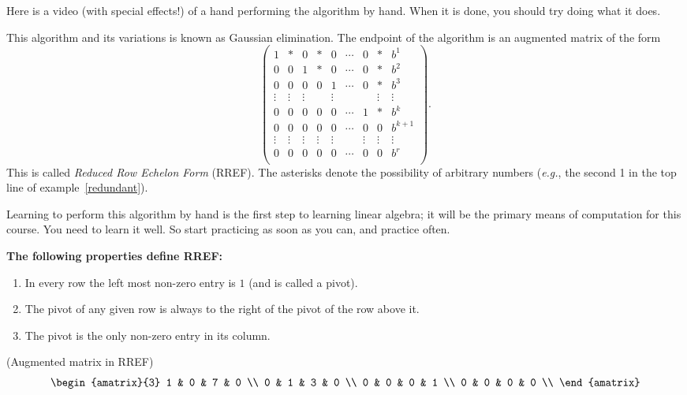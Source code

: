Here is a video (with special effects!) of a hand performing the algorithm by hand. When it is done, you should try doing what it does.

\noindent
This algorithm and its variations is known as Gaussian elimination. The endpoint of the algorithm is  an augmented matrix of the form \label{Reduced row echelon form} 
\[\left(
\begin{array}{cccccccc|c}
1       	& * & 0		& * & 0		& \cdots& 0	&*	& b^1 \\[.5mm] 
0	        & 0 & 1		& * & 0		& \cdots& 0	&*	& b^2 \\[.5mm]
0		& 0& 0		& 0 & 1		& \cdots& 0	&*	& b^3 \\[.5mm]  
\vdots  	& \vdots& \vdots	&   & \vdots &	& 	& 
\vdots			& \vdots \\[2mm]  
0		& 0&	0		&  0& 0			&  \cdots   & 1		&*	& b^k \\[.5mm]  
0		& 0 & 0		& 0 & 0		& \cdots& 0 	&0	& b^{k+1} \\[.5mm] 
\vdots  	& \vdots & \vdots	&  \vdots & \vdots	& 	& \vdots	&\vdots	& \vdots \\[.5mm]  
0		&  0 & 0		& 0 & 0		& \cdots& 0		 & 0& b^r \\ 
\end{array}\!\right).\]
This is called 
\emph{Reduced Row Echelon Form} (RREF).
The asterisks denote the possibility of arbitrary numbers ({\itshape e.g.}, the second 1 in the top line of example~\ref{redundant}).

Learning to perform this algorithm by hand is the first step to learning linear algebra; it will be the primary means of computation for this course. You need to learn it well. So start practicing as soon as you can, and practice often. 


\newpage
\begin{center}
\Large{{\bf The following properties define RREF:}}
\end{center}
\begin{enumerate}
\item  In every row  the left most non-zero entry is  $1$ (and is called a pivot).
\item The pivot of any given row is always to the right of the pivot of the row above it.
\item The pivot is the only non-zero entry in its column.
\end{enumerate}
\begin{example}\label{augrref} (Augmented matrix in RREF)
\[
\begin{amatrix}{3} 
1 & 0 & 7 & 0 \\ 
0 & 1 & 3 & 0 \\
0 & 0 & 0 & 1 \\
0 & 0 & 0 & 0 \\
\end{amatrix}
\]
\end{example}

